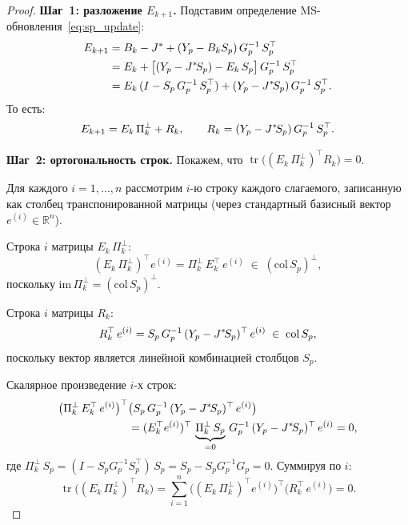 \begin{proof}

\textbf{Шаг~1: разложение $E_{k+1}$.}
Подставим определение MS-обновления~\eqref{eq:sp_update}:
\begin{align}
  E_{k+1}
  &= B_k - J^{*} + (Y_p - B_k S_p)\,G_p^{-1}\,S_p^\top \notag\\
  &= E_k + \bigl[(Y_p - J^{*}\!S_p) - E_k\,S_p\bigr]\,G_p^{-1}\,S_p^\top \notag\\
  &= E_k\,(I - S_p\,G_p^{-1}\,S_p^\top)
     + (Y_p - J^{*}\!S_p)\,G_p^{-1}\,S_p^\top. \label{eq:Ek1_full}
\end{align}
То есть:
\begin{equation}\label{eq:Ek1_compact}
  E_{k+1} = E_k\,\Pi_k^\perp + R_k,
  \qquad R_k = (Y_p - J^{*}\!S_p)\,G_p^{-1}\,S_p^\top.
\end{equation}

\medskip
\textbf{Шаг~2: ортогональность строк.}
Покажем, что $\operatorname{tr}\!\bigl((E_k\,\Pi_k^\perp)^\top R_k\bigr) = 0$.

Для каждого $i = 1, \ldots, n$ рассмотрим $i$-ю строку каждого слагаемого,
записанную как столбец транспонированной матрицы (через стандартный
базисный вектор $e^{(i)}\in\mathbb{R}^n$).

Строка $i$ матрицы $E_k\,\Pi_k^\perp$:
\[
  (E_k\,\Pi_k^\perp)^\top e^{(i)} = \Pi_k^\perp\,E_k^\top\,e^{(i)}
  \;\in\; (\mathrm{col}\,S_p)^\perp,
\]
поскольку $\mathrm{im}\,\Pi_k^\perp = (\mathrm{col}\,S_p)^\perp$.

Строка $i$ матрицы $R_k$:
\[
  R_k^\top\,e^{(i)} = S_p\,G_p^{-1}\,(Y_p - J^{*}\!S_p)^\top\,e^{(i)}
  \;\in\; \mathrm{col}\,S_p,
\]
поскольку вектор является линейной комбинацией столбцов $S_p$.

Скалярное произведение $i$-х строк:
\begin{align*}
  \bigl(\Pi_k^\perp\,E_k^\top\,e^{(i)}\bigr)^\top
  &\bigl(S_p\,G_p^{-1}\,(Y_p - J^{*}\!S_p)^\top\,e^{(i)}\bigr) \\
  &= (E_k^\top e^{(i)})^\top\,
     \underbrace{\Pi_k^\perp\,S_p}_{= 0}\,
     G_p^{-1}\,(Y_p - J^{*}\!S_p)^\top\,e^{(i)}
  = 0,
\end{align*}
где $\Pi_k^\perp\,S_p = (I - S_p G_p^{-1} S_p^\top)\,S_p
= S_p - S_p G_p^{-1} G_p = 0$.
Суммируя по $i$:
\begin{equation}\label{eq:cross_zero}
  \operatorname{tr}\!\bigl((E_k\,\Pi_k^\perp)^\top R_k\bigr)
  = \sum_{i=1}^{n}
    \bigl((E_k\,\Pi_k^\perp)^\top e^{(i)}\bigr)^\top
    \bigl(R_k^\top\,e^{(i)}\bigr) = 0.
\end{equation}


\end{proof}
